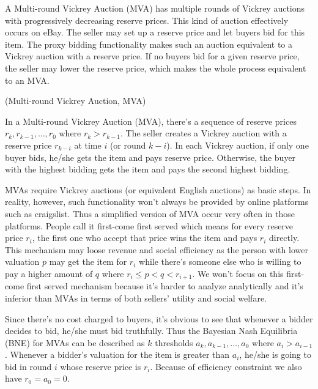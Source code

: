 A Multi-round Vickrey Auction (MVA) has multiple rounds of Vickrey
auctions with progressively decreasing reserve prices. This kind of auction
effectively occurs on eBay. The seller may set up a reserve price and let
buyers bid for this item. The proxy bidding functionality makes such an auction
equivalent to a Vickrey auction with a reserve price. If no buyers bid for a
given reserve price, the seller may lower the reserve price, which makes the
whole process equivalent to an MVA.

\begin{definition}(Multi-round Vickrey Auction, MVA)

In a Multi-round Vickrey Auction (MVA), there's a sequence of reserve prices
$r_k, r_{k-1}, \ldots, r_0$ where $r_k > r_{k-1}$. The seller creates a Vickrey
auction with a reserve price $r_{k-i}$ at time $i$ (or round $k-i$). In each
Vickrey auction, if only one buyer bids, he/she gets the item and pays reserve
price. Otherwise, the buyer with the highest bidding gets the item and pays the
second highest bidding.

\end{definition}

MVAs require Vickrey auctions (or equivalent English auctions) as basic steps.
In reality, however, such functionality won't always be provided by online
platforms such as craigslist. Thus a simplified version of MVA occur very often
in those platforms. People call it first-come first served which means for
every reserve price $r_i$, the first one who accept that price wins the item
and pays $r_i$ directly. This mechanism may loose revenue and social efficiency
as the person with lower valuation $p$ may get the item for $r_i$ while there's
someone else who is willing to pay a higher amount of $q$ where $r_i \leq p < q
< r_{i+1}$. We won't focus on this first-come first served mechanism because
it's harder to analyze analytically and it's inferior than MVAs in terms of
both sellers' utility and social welfare.

Since there's no cost charged to buyers, it's obvious to see that whenever a
bidder decides to bid, he/she must bid truthfully. Thus the Bayesian Nash
Equilibria (BNE) for MVAs can be described as $k$ thresholds $a_k, a_{k-1},
\ldots, a_0$ where $a_i > a_{i-1}$. Whenever a bidder's valuation for the item
is greater than $a_i$, he/she is going to bid in round $i$ whose reserve price
is $r_i$. Because of efficiency constraint we also have $r_0 = a_0 = 0$.

